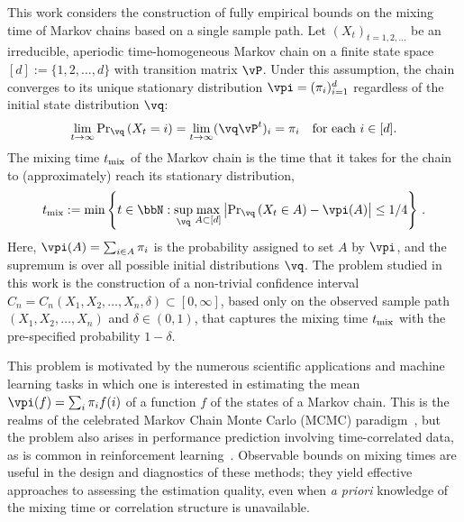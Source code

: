 

This work considers the construction of fully empirical bounds on the
mixing time of Markov chains based on a single sample path.
Let $(X_t)_{t=1,2,\dotsc}$ be an irreducible, aperiodic
time-homogeneous Markov chain on a finite state space $[d] :=
\{1,2,\dotsc,d\}$ with transition matrix $\vP$.
Under this assumption, the chain converges to its unique stationary
 distribution $\vpi =
(\pi_i)_{i=1}^d$ regardless of the initial state distribution $\vq$: 
\[
  \lim_{t\to\infty} {\Pr}_{\vq}\Parens{X_t = i}
  = \lim_{t\to\infty} (\vq \vP^t)_i = \pi_i
  \quad \text{for each $i \in [d]$} .
\]
The mixing time $t_{\operatorname{mix}}$ of the Markov chain is the time that it takes
for the chain to (approximately) reach its stationary distribution,
\begin{align}
\label{eq:mixtimedef}
  \tmix
  :=
  \min\Braces{
    t \in \bbN :
    \sup_{\vq}
    \max_{A\subset [d]}
    \Abs{
      \textstyle\Pr_{\vq}\Parens{ X_t \in A } - \vpi(A)
    }
    \leq 1/4
  }\,.
\end{align}
Here, $\vpi(A) = \sum_{i\in A} \pi_i$ is the probability assigned to
set $A$ by $\vpi$, and the supremum is over all possible initial
distributions $\vq$.
The problem studied in this work is the construction of a non-trivial
confidence interval $C_n = C_n(X_1,X_2,\dotsc,X_n,\delta) \subset
[0,\infty]$, based only on the observed sample path
$(X_1,X_2,\dotsc,X_n)$ and $\delta \in (0,1)$, that captures the
mixing time $t_{\operatorname{mix}}$ with the pre-specified probability $1-\delta$. 

This problem is motivated by the numerous scientific applications and
machine learning tasks in which one is interested in estimating the
mean $\vpi(f) = \sum_i \pi_i f(i)$ of a function $f$ of the states of
a Markov chain.
This is the realms of the celebrated Markov Chain Monte Carlo (MCMC)
paradigm~\cite{liu2001monte}, but the problem also arises in
performance prediction involving time-correlated data, as is common in
reinforcement learning~\cite{sutton98}.
Observable bounds on mixing times are useful in the design and
diagnostics of these methods; they yield effective approaches to
assessing the estimation quality, even when \emph{a priori} knowledge
of the mixing time or correlation structure is unavailable.

